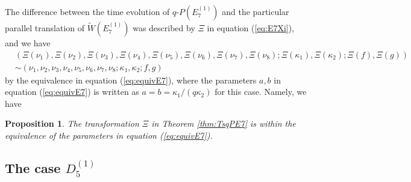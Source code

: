 \documentclass[12pt]{amsart}
\numberwithin{equation}{section}
\newtheorem{prop}{\bf Proposition}[section]
\theoremstyle{definition}
\begin{document}
The difference between the time evolution of $q$-$P(E^{(1)}_7)$ and the particular parallel translation of $\widetilde{W}(E^{(1)}_{7})$ was described by $\Xi $ in equation (\ref{eq:E7Xi}), and we have
\begin{align}
& ( \Xi (\nu_1) , \Xi (\nu_2 ) , \Xi (\nu_3 ) , \Xi (\nu_4 ) , \Xi (\nu_5 ) , \Xi (\nu_6 ) , \Xi (\nu_7 ) , \Xi (\nu_8 ) ; \Xi (\kappa_1) , \Xi (\kappa_2 ) ; \Xi (f ) , \Xi (g ) )  \\ 
& \sim (\nu_1 , \nu_2 , \nu_3 , \nu_4 ,\nu_5 ,\nu_6 , \nu_7 ,\nu_8 ;\kappa_1 ,\kappa_2 ; f ,g ) \nonumber
\end{align}
by the equivalence in equation  (\ref{eq:equivE7}), where the parameters $a,b$ in equation (\ref{eq:equivE7}) is written as $ a = b = \kappa_1 /( q \kappa_2 ) $ for this case.
Namely, we have
\begin{prop}
The transformation $\Xi $ in Theorem \ref{thm:TsqPE7} is within the equivalence of the parameters in equation (\ref{eq:equivE7}).
\end{prop}

\subsection{The case $D^{(1)}_5 $} \label{sec:D15}
\end{document}
